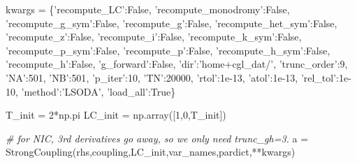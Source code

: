 \documentclass[
  english,
  a4paper,
  oneside]{article}
\newenvironment{Shaded}{}{}
\newcommand{\CommentTok}[1]{\textcolor[rgb]{0.38,0.63,0.69}{\textit{#1}}}
\newcommand{\DecValTok}[1]{\textcolor[rgb]{0.25,0.63,0.44}{#1}}
\newcommand{\FloatTok}[1]{\textcolor[rgb]{0.25,0.63,0.44}{#1}}
\newcommand{\NormalTok}[1]{#1}
\newcommand{\OperatorTok}[1]{\textcolor[rgb]{0.40,0.40,0.40}{#1}}
\newcommand{\StringTok}[1]{\textcolor[rgb]{0.25,0.44,0.63}{#1}}
\newcommand{\VariableTok}[1]{\textcolor[rgb]{0.10,0.09,0.49}{#1}}
\begin{document}
\begin{Shaded}
\begin{Highlighting}[]
\NormalTok{    kwargs }\OperatorTok{=}\NormalTok{ \{}\StringTok{'recompute_LC'}\NormalTok{:}\VariableTok{False}\NormalTok{,}
              \StringTok{'recompute_monodromy'}\NormalTok{:}\VariableTok{False}\NormalTok{,}
              \StringTok{'recompute_g_sym'}\NormalTok{:}\VariableTok{False}\NormalTok{,}
              \StringTok{'recompute_g'}\NormalTok{:}\VariableTok{False}\NormalTok{,}
              \StringTok{'recompute_het_sym'}\NormalTok{:}\VariableTok{False}\NormalTok{,}
              \StringTok{'recompute_z'}\NormalTok{:}\VariableTok{False}\NormalTok{,}
              \StringTok{'recompute_i'}\NormalTok{:}\VariableTok{False}\NormalTok{,}
              \StringTok{'recompute_k_sym'}\NormalTok{:}\VariableTok{False}\NormalTok{,}
              \StringTok{'recompute_p_sym'}\NormalTok{:}\VariableTok{False}\NormalTok{,}
              \StringTok{'recompute_p'}\NormalTok{:}\VariableTok{False}\NormalTok{,}
              \StringTok{'recompute_h_sym'}\NormalTok{:}\VariableTok{False}\NormalTok{,}
              \StringTok{'recompute_h'}\NormalTok{:}\VariableTok{False}\NormalTok{,}
              \StringTok{'g_forward'}\NormalTok{:}\VariableTok{False}\NormalTok{,}
              \StringTok{'dir'}\NormalTok{:}\StringTok{'home+cgl_dat/'}\NormalTok{,}
              \StringTok{'trunc_order'}\NormalTok{:}\DecValTok{9}\NormalTok{,}
              \StringTok{'NA'}\NormalTok{:}\DecValTok{501}\NormalTok{,}
              \StringTok{'NB'}\NormalTok{:}\DecValTok{501}\NormalTok{,}
              \StringTok{'p_iter'}\NormalTok{:}\DecValTok{10}\NormalTok{,}
              \StringTok{'TN'}\NormalTok{:}\DecValTok{20000}\NormalTok{,}
              \StringTok{'rtol'}\NormalTok{:}\FloatTok{1e-13}\NormalTok{,}
              \StringTok{'atol'}\NormalTok{:}\FloatTok{1e-13}\NormalTok{,}
              \StringTok{'rel_tol'}\NormalTok{:}\FloatTok{1e-10}\NormalTok{,}
              \StringTok{'method'}\NormalTok{:}\StringTok{'LSODA'}\NormalTok{,}
              \StringTok{'load_all'}\NormalTok{:}\VariableTok{True}\NormalTok{\}}
              
\NormalTok{    T_init }\OperatorTok{=} \DecValTok{2}\OperatorTok{*}\NormalTok{np.pi}
\NormalTok{    LC_init }\OperatorTok{=}\NormalTok{ np.array([}\DecValTok{1}\NormalTok{,}\DecValTok{0}\NormalTok{,T_init])}
    
    \CommentTok{# for NIC, 3rd derivatives go away, so we only need trunc_gh=3.}
\NormalTok{    a }\OperatorTok{=}\NormalTok{ StrongCoupling(rhs,coupling,LC_init,var_names,pardict,}\OperatorTok{**}\NormalTok{kwargs)}
\end{Highlighting}
\end{Shaded}
\end{document}
